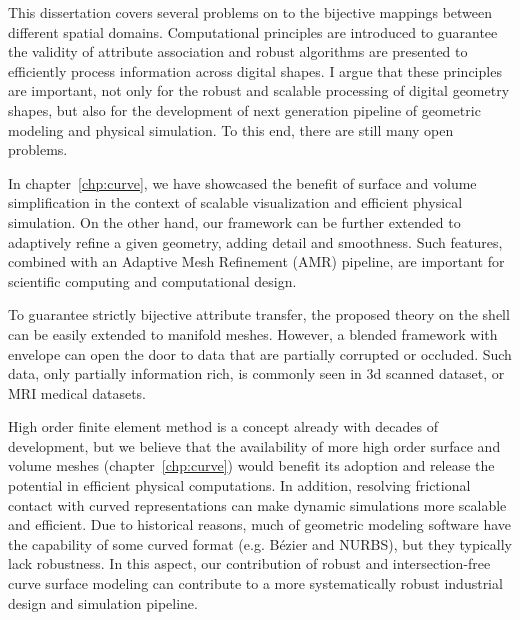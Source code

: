 This dissertation covers several problems on to the bijective mappings between different spatial domains. Computational principles are introduced to guarantee the validity of attribute association and robust algorithms are presented to efficiently process information across digital shapes. I argue that these principles are important, not only for the robust and scalable processing of digital geometry shapes, but also for the development of next generation pipeline of geometric modeling and physical simulation. To this end, there are still many open problems.


In chapter~\ref{chp:curve}, we have showcased the benefit of surface and volume simplification in the context of scalable visualization and efficient physical simulation. On the other hand, our framework can be further extended to adaptively refine a given geometry, adding detail and smoothness. Such features, combined with an Adaptive Mesh Refinement (AMR) pipeline, are important for scientific computing and computational design.

To guarantee strictly bijective attribute transfer, the proposed theory on the shell can be easily extended to manifold meshes.
However, a blended framework with envelope \cite{hu2018tetrahedral, Wang:2021} can open the door to  data that are partially corrupted or occluded. Such data, only partially information rich, is commonly seen in 3d scanned dataset, or MRI medical datasets.

High order finite element method is a concept already with decades of development, but we believe that the availability of more high order surface and volume meshes (chapter~\ref{chp:curve}) would benefit its adoption and release the potential in efficient physical computations. In addition, resolving frictional contact with curved representations \cite{ferguson2022high} can make dynamic simulations more scalable and efficient. 
Due to historical reasons, much of geometric modeling software have the capability of some curved format (e.g. B{\'e}zier and NURBS), but they typically lack robustness. In this aspect, our contribution of robust and intersection-free curve surface modeling can contribute to a more systematically robust industrial design and simulation pipeline.

